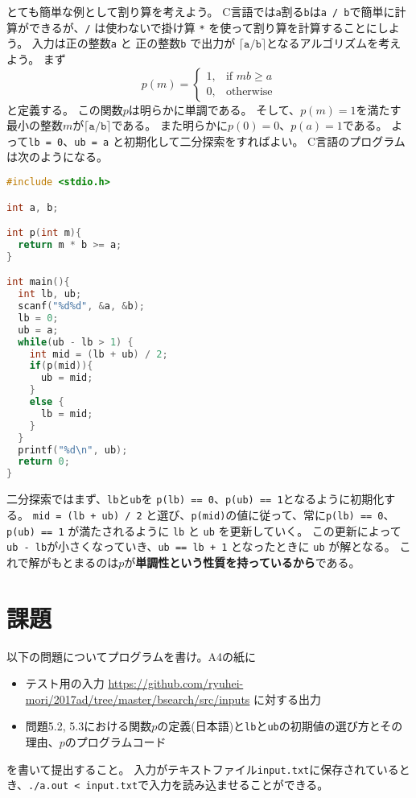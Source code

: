 \documentclass[a4paper,twoside,onecolumn,openany,article,10pt]{memoir}
\theoremstyle{remark}
\begin{document}
とても簡単な例として割り算を考えよう。
C言語では\texttt{a}割る\texttt{b}は\texttt{a / b}で簡単に計算ができるが、\texttt{/} は使わないで掛け算 \texttt{*} を使って割り算を計算することにしよう。
入力は正の整数\texttt{a} と 正の整数\texttt{b} で出力が $\mathtt{\lceil a / b \rceil}$となるアルゴリズムを考えよう。
まず
\begin{equation*}
p(m)=
\begin{cases}
1, & \text{if } mb \ge a\\
0, & \text{otherwise}
\end{cases}
\end{equation*}
と定義する。
この関数$p$は明らかに単調である。
そして、$p(m)=1$を満たす最小の整数$m$が$\mathtt{\lceil  a / b \rceil}$である。
また明らかに$p(0)=0$、$p(a)=1$である。
よって\texttt{lb = 0}、\texttt{ub = a} と初期化して二分探索をすればよい。
C言語のプログラムは次のようになる。

\begin{lstlisting}[basicstyle=\ttfamily\small,showstringspaces=false,language=C,frame=single]
#include <stdio.h>

int a, b;

int p(int m){
  return m * b >= a;
}

int main(){
  int lb, ub;
  scanf("%d%d", &a, &b);
  lb = 0;
  ub = a;
  while(ub - lb > 1) {
    int mid = (lb + ub) / 2;
    if(p(mid)){
      ub = mid;
    }
    else {
      lb = mid;
    }
  }
  printf("%d\n", ub);
  return 0;
}
\end{lstlisting}

二分探索ではまず、\texttt{lb}と\texttt{ub}を \texttt{p(lb) == 0}、\texttt{p(ub) == 1}となるように初期化する。
\texttt{mid = (lb + ub) / 2} と選び、\texttt{p(mid)}の値に従って、常に\texttt{p(lb) == 0}、\texttt{p(ub) == 1} が満たされるように \texttt{lb} と \texttt{ub} を更新していく。
この更新によって\texttt{ub - lb}が小さくなっていき、\texttt{ub == lb + 1} となったときに \texttt{ub} が解となる。
これで解がもとまるのは$p$が\textbf{単調性という性質を持っているから}である。

\clearpage
\section{課題}\label{sec:assign}
以下の問題についてプログラムを書け。A4の紙に
\begin{itemize}
\item テスト用の入力 \url{https://github.com/ryuhei-mori/2017ad/tree/master/bsearch/src/inputs} に対する出力
\item 問題5.2, 5.3における関数$p$の定義(日本語)と\texttt{lb}と\texttt{ub}の初期値の選び方とその理由、$p$のプログラムコード
\end{itemize}
を書いて提出すること。
入力がテキストファイル\texttt{input.txt}に保存されているとき、\texttt{./a.out < input.txt}で入力を読み込ませることができる。
\end{document}
